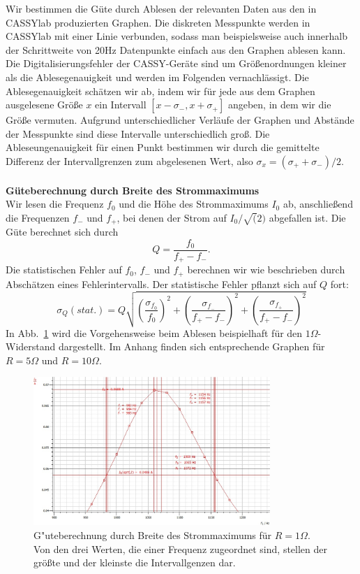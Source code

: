 \documentclass[12pt,a4paper]{article}
\begin{document}
Wir bestimmen die Güte durch Ablesen der relevanten Daten aus den in CASSYlab produzierten Graphen. Die diskreten Messpunkte werden in CASSYlab mit einer Linie verbunden, sodass man beispielsweise auch innerhalb der Schrittweite von 20Hz Datenpunkte einfach aus den Graphen ablesen kann.
Die Digitalisierungsfehler der CASSY-Geräte sind um Größenordnungen kleiner als die Ablesegenauigkeit und werden im Folgenden vernachlässigt. Die Ablesegenauigkeit schätzen wir ab, indem wir für jede aus dem Graphen ausgelesene Größe $x$ ein Intervall $[x-\sigma_-,x+\sigma_+]$ angeben, in dem wir die Größe vermuten. Aufgrund unterschiedlicher Verläufe der Graphen und Abstände der Messpunkte sind diese Intervalle unterschiedlich groß. Die Ableseungenauigkeit für einen Punkt bestimmen wir durch die gemittelte Differenz der Intervallgrenzen zum abgelesenen Wert, also $\sigma_x=(\sigma_++\sigma_-)/2$.\\
\\
\textbf{Güteberechnung durch Breite des Strommaximums}\\
Wir lesen die Frequenz $f_0$ und die Höhe des Strommaximums $I_0$ ab, anschließend die Frequenzen $f_- $ und $f_+$, bei denen der Strom auf $I_0/\sqrt(2)$ abgefallen ist.  Die Güte berechnet sich durch
\begin{equation}\label{eq:guete_ueber_f}
Q=\frac{f_0}{f_+-f_-}.
\end{equation}
Die statistischen Fehler auf $f_0$, $f_-$ und $f_+$ berechnen wir wie beschrieben durch Abschätzen eines Fehlerintervalls. Der statistische Fehler pflanzt sich auf $Q$ fort:
\begin{equation}\label{eq:Fehlerfortpflanzung_Qdurchf}
\sigma_Q(stat.)=Q\sqrt{\left(\frac{\sigma_{f_0}}{f_0}\right)^2+\left(\frac{\sigma_{f_-}}{f_+-f_-}\right)^2+\left(\frac{\sigma_{f_+}}{f_+-f_-}\right)^2}
\end{equation}
In Abb.~\ref{S1Ohm_f0} wird die Vorgehensweise beim Ablesen beispielhaft für den $1\Omega$-Widerstand dargestellt. Im Anhang finden sich entsprechende Graphen für $R=5\Omega$ und $R=10\Omega$.
\begin{figure}[H]
	\centering
	\includegraphics[width=0.8\textwidth]{Daten/S1Ohm_f0.jpg}
	\caption{G"uteberechnung durch Breite des Strommaximums für $R=1\Omega$. Von den drei Werten, die einer Frequenz zugeordnet sind, stellen der größte und der kleinste die Intervallgenzen dar.}
	\label{S1Ohm_f0}
\end{figure}
\end{document}

